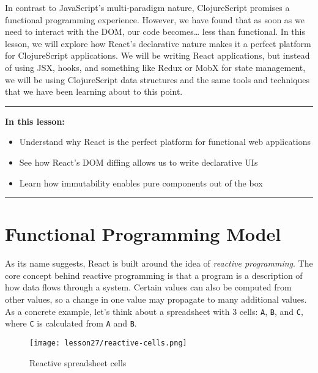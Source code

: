 \documentclass[10pt,twoside,openright]{memoir}
\begin{document}
In contrast to JavaScript's multi-paradigm nature, ClojureScript
promises a functional programming experience. However, we have found
that as soon as we need to interact with the DOM, our code
becomes\ldots{} less than functional. In this lesson, we will explore
how React's declarative nature makes it a perfect platform for
ClojureScript applications. We will be writing React applications, but
instead of using JSX, hooks, and something like Redux or MobX for state
management, we will be using ClojureScript data structures and the same
tools and techniques that we have been learning about to this point.

\begin{center}\rule{0.5\linewidth}{0.5pt}\end{center}

\textbf{In this lesson:}

\begin{itemize}
\tightlist
\item
  Understand why React is the perfect platform for functional web
  applications
\item
  See how React's DOM diffing allows us to write declarative UIs
\item
  Learn how immutability enables pure components out of the box
\end{itemize}

\begin{center}\rule{0.5\linewidth}{0.5pt}\end{center}


\section{Functional Programming Model}

As its name suggests, React is built around the idea of \emph{reactive
programming}. The core concept behind reactive programming is that a
program is a description of how data flows through a system. Certain
values can also be computed from other values, so a change in one value
may propagate to many additional values. As a concrete example, let's
think about a spreadsheet with 3 cells: \texttt{A}, \texttt{B}, and
\texttt{C}, where \texttt{C} is calculated from \texttt{A} and
\texttt{B}.


\begin{figure}[H]
\caption{Reactive spreadsheet cells}
\centering
\texttt{[image: lesson27/reactive-cells.png]}
\end{figure}
\end{document}
